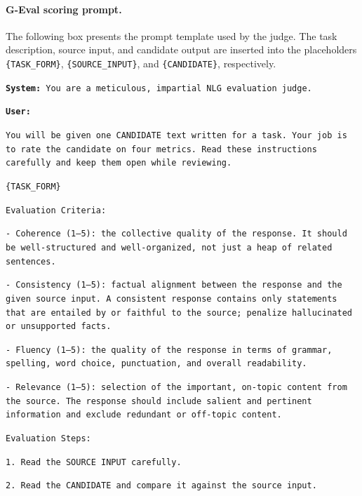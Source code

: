 \documentclass{article} %
\begin{document}
\paragraph{G-Eval scoring prompt.}
The following box presents the prompt template used by the judge. The task description, source input, and candidate output are inserted into the placeholders \texttt{\{TASK\_FORM\}}, \texttt{\{SOURCE\_INPUT\}}, and \texttt{\{CANDIDATE\}}, respectively.

\begin{tcolorbox}[
    colback=gray!5,
    colframe=black!45,
    title=Reference-free G-Eval prompt,
    breakable,
    left=3pt,
    right=3pt,
    top=3pt,
    bottom=3pt
]
\small
\texttt{\textbf{System:} You are a meticulous, impartial NLG evaluation judge.}

\medskip

\texttt{\textbf{User:}}

\texttt{You will be given one CANDIDATE text written for a task. Your job is to rate the candidate on four metrics. Read these instructions carefully and keep them open while reviewing.}

\medskip

\texttt{\{TASK\_FORM\}}

\medskip

\texttt{Evaluation Criteria:}

\texttt{- Coherence (1--5): the collective quality of the response. It should be well-structured and well-organized, not just a heap of related sentences.}

\texttt{- Consistency (1--5): factual alignment between the response and the given source input. A consistent response contains only statements that are entailed by or faithful to the source; penalize hallucinated or unsupported facts.}

\texttt{- Fluency (1--5): the quality of the response in terms of grammar, spelling, word choice, punctuation, and overall readability.}

\texttt{- Relevance (1--5): selection of the important, on-topic content from the source. The response should include salient and pertinent information and exclude redundant or off-topic content.}

\medskip

\texttt{Evaluation Steps:}

\texttt{1. Read the SOURCE INPUT carefully.}

\texttt{2. Read the CANDIDATE and compare it against the source input.}


\end{tcolorbox}
\end{document}
